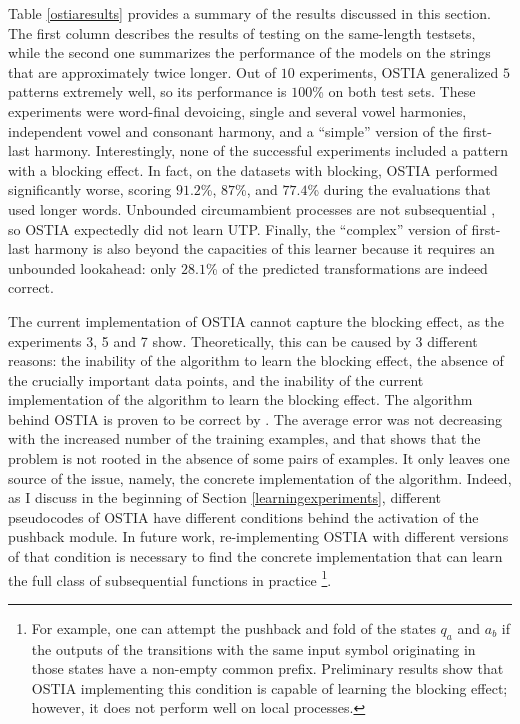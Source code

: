 Table \ref{ostiaresults} provides a summary of the results discussed in this section.
The first column describes the results of testing on the same-length testsets, while the second one summarizes the performance of the models on the strings that are approximately twice longer.
Out of $10$ experiments, OSTIA generalized $5$ patterns extremely well, so its performance is $100$\% on both test sets.
These experiments were word-final devoicing, single and several vowel harmonies, independent vowel and consonant harmony, and a ``simple'' version of the first-last harmony.
Interestingly, none of the successful experiments included a pattern with a blocking effect. 
In fact, on the datasets with blocking, OSTIA performed significantly worse, scoring $91.2$\%, $87$\%, and $77.4$\% during the evaluations that used longer words.
Unbounded circumambient processes are not subsequential \citep{Jardine2016}, so OSTIA expectedly did not learn UTP.
Finally, the ``complex'' version of first-last harmony is also beyond the capacities of this learner because it requires an unbounded lookahead: only $28.1$\% of the predicted transformations are indeed correct.

The current implementation of OSTIA cannot capture the blocking effect, as the experiments 3, 5 and 7 show.
Theoretically, this can be caused by 3 different reasons: the inability of the algorithm to learn the blocking effect, the absence of the crucially important data points, and the inability of the current implementation of the algorithm to learn the blocking effect.
The algorithm behind OSTIA is proven to be correct by \cite{OncinaEtAl1993}.
The average error was not decreasing with the increased number of the training examples, and that shows that the problem is not rooted in the absence of some pairs of examples.
It only leaves one source of the issue, namely, the concrete implementation of the algorithm.
Indeed, as I discuss in the beginning of Section \ref{learningexperiments}, different pseudocodes of OSTIA have different conditions behind the activation of the pushback module.
In future work, re-implementing OSTIA with different versions of that condition is necessary to find the concrete implementation that can learn the full class of subsequential functions in practice%
\footnote{For example, one can attempt the pushback and fold of the states $q_a$ and $a_b$ if the outputs of the transitions with the same input symbol originating in those states have a non-empty common prefix.
Preliminary results show that OSTIA implementing this condition is capable of learning the blocking effect; however, it does not perform well on local processes.}.


